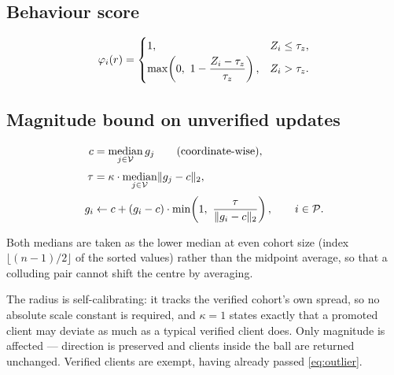 \subsection{Behaviour score}

\begin{equation}
\varphi_i(r)=
\begin{cases}
1, & Z_i \le \tau_z,\\[2pt]
\max\!\left(0,\ 1 - \dfrac{Z_i - \tau_z}{\tau_z}\right), & Z_i > \tau_z.
\end{cases}
\label{eq:phi}
\end{equation}


\subsection{Magnitude bound on unverified updates}

\begin{align}
c &= \operatorname*{median}_{j \in \mathcal{V}} g_j
\qquad\text{(coordinate-wise)},
\label{eq:consensus}\\[2pt]
\tau &= \kappa \cdot \operatorname*{median}_{j \in \mathcal{V}} \lVert g_j - c \rVert_2,
\label{eq:radius}\\[2pt]
g_i &\leftarrow c + (g_i - c)\cdot\min\!\left(1,\ \frac{\tau}{\lVert g_i - c\rVert_2}\right),
\qquad i \in \mathcal{P}.
\label{eq:clip}
\end{align}

Both medians are taken as the lower median at even cohort size (index
$\lfloor (n-1)/2 \rfloor$ of the sorted values) rather than the midpoint average,
so that a colluding pair cannot shift the centre by averaging.

The radius is self-calibrating: it tracks the verified cohort's own spread, so
no absolute scale constant is required, and $\kappa=1$ states exactly that a
promoted client may deviate as much as a typical verified client does. Only
magnitude is affected --- direction is preserved and clients inside the ball are
returned unchanged. Verified clients are exempt, having already passed
\eqref{eq:outlier}.

